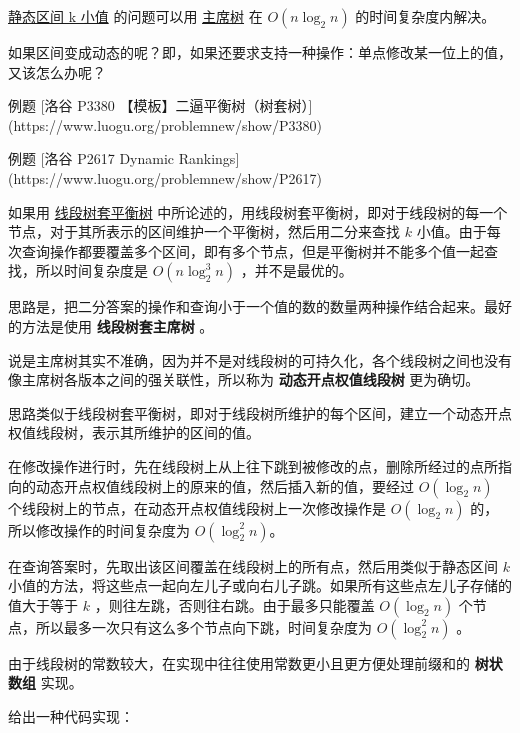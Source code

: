 
\href{https://www.luogu.org/problemnew/show/P3834}{静态区间 k 小值} 的问题可以用 \href{/ds/persistent-seg/}{主席树} 在 $O(n\log_2 n)$ 的时间复杂度内解决。

如果区间变成动态的呢？即，如果还要求支持一种操作：单点修改某一位上的值，又该怎么办呢？

\begin{NOTE}{ 例题 [洛谷 P3380 【模板】二逼平衡树（树套树）](https://www.luogu.org/problemnew/show/P3380)}{}

\end{NOTE}


\begin{NOTE}{ 例题 [洛谷 P2617 Dynamic Rankings](https://www.luogu.org/problemnew/show/P2617)}{}

\end{NOTE}


如果用 \href{/ds/balanced-in-seg/}{线段树套平衡树} 中所论述的，用线段树套平衡树，即对于线段树的每一个节点，对于其所表示的区间维护一个平衡树，然后用二分来查找 $k$ 小值。由于每次查询操作都要覆盖多个区间，即有多个节点，但是平衡树并不能多个值一起查找，所以时间复杂度是 $O(n\log_2^3 n)$ ，并不是最优的。

思路是，把二分答案的操作和查询小于一个值的数的数量两种操作结合起来。最好的方法是使用 \textbf{ 线段树套主席树 } 。

说是主席树其实不准确，因为并不是对线段树的可持久化，各个线段树之间也没有像主席树各版本之间的强关联性，所以称为 \textbf{ 动态开点权值线段树 } 更为确切。 

思路类似于线段树套平衡树，即对于线段树所维护的每个区间，建立一个动态开点权值线段树，表示其所维护的区间的值。

在修改操作进行时，先在线段树上从上往下跳到被修改的点，删除所经过的点所指向的动态开点权值线段树上的原来的值，然后插入新的值，要经过 $O(\log_2 n)$ 个线段树上的节点，在动态开点权值线段树上一次修改操作是 $O(\log_2 n)$ 的，所以修改操作的时间复杂度为 $O(\log_2^2 n)$。 

在查询答案时，先取出该区间覆盖在线段树上的所有点，然后用类似于静态区间 $k$ 小值的方法，将这些点一起向左儿子或向右儿子跳。如果所有这些点左儿子存储的值大于等于 $k$ ，则往左跳，否则往右跳。由于最多只能覆盖 $O(\log_2 n)$ 个节点，所以最多一次只有这么多个节点向下跳，时间复杂度为 $O(\log_2^2 n)$ 。 

由于线段树的常数较大，在实现中往往使用常数更小且更方便处理前缀和的 \textbf{ 树状数组 } 实现。 

给出一种代码实现：

